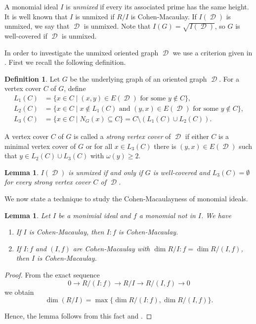 \documentclass[12pt, amscd]{amsart}
\newtheorem{lem}[thm]{Lemma}
\theoremstyle{definition}
\newtheorem{defn}[thm]{Definition}
\DeclareMathOperator{\D}{\mathcal{D}}
\newcommand{\0}{\bold{0}}
\begin{document}
A monomial ideal $I$ is {\it unmixed} if every its associated prime has the same height.  It is well known that $I$ is unmixed if $R/I$ is Cohen-Macaulay.  If $I(\D)$ is unmixed,  we say that $\D$ is unmixed.  Note that $I(G)=\sqrt{I(\D)}$, so $G$ is well-covered if $\D$ is unmixed.  

In order to investigate the unmixed oriented graph $\D$ we use a criterion given in \cite{PRT}. First we recall the following definition.

\begin{defn} Let $G$ be the underlying graph of an oriented graph $\D$. For a vertex cover $C$ of $G$, define
\begin{align*}
L_1(C) &= \{x\in C \mid (x,y) \in E(\D) \text { for some } y\notin C\},\\
L_2(C) &=\{x\in C\mid x\notin L_1(C) \text{ and } (y,x)\in E(\D) \text{ for some } y\notin C\},\\
L_3(C) &= \{x\in C\mid N_G(x)\subseteq C\} = C \setminus (L_1(C) \cup L_2(C)).
\end{align*}

A vertex cover $C$ of $G$ is called a {\it strong vertex cover} of $\D$ if either $C$ is a minimal vertex cover of $G$ or for all $x\in L_3(C)$ there is $(y, x)\in E(\D)$ such that $y\in L_2(C)\cup L_3(C)$ with $\omega(y)\geqslant 2$. 
\end{defn}

\begin{lem} \cite[Theorem 31]{PRT}\label{unmixedness} $I(\D)$ is unmixed if and only if $G$ is well-covered and $L_3(C)=\emptyset$ for every strong vertex cover $C$ of $\D$.
\end{lem}

\medskip

We now state a technique to study the Cohen-Macaulayness of monomial ideals.

\begin{lem}\label{CM-Q} Let $I$ be a monimial ideal and $f$ a monomial not in $I$.  We have 
\begin{enumerate}
\item If $I$ is Cohen-Macaulay, then $I\colon f$ is Cohen-Macaulay.
\item If $I\colon f$ and $(I,f)$ are Cohen-Macaulay with $\dim R/I\colon f = \dim R/(I,f)$, then $I$ is Cohen-Macaulay.
\end{enumerate}
\end{lem}
\begin{proof} From the exact sequence 
$$0 \to R/(I\colon f) \to R/I \to R/(I,f)\to 0$$
we obtain
$$\dim(R/I) = \max\{\dim R/(I\colon f), \dim R/(I,f)\}.$$

Hence, the lemma follows from this fact and \cite[Lemma 4.1 and Theorem 4.3]{CHHKTT}.
\end{proof}
\end{document}
